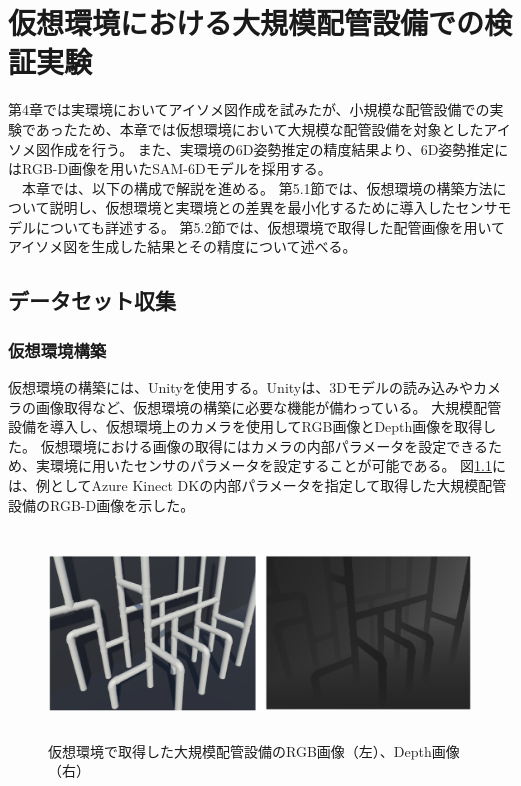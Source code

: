 ﻿\chapter{仮想環境における大規模配管設備での検証実験}
第4章では実環境においてアイソメ図作成を試みたが、小規模な配管設備での実験であったため、本章では仮想環境において大規模な配管設備を対象としたアイソメ図作成を行う。
また、実環境の6D姿勢推定の精度結果より、6D姿勢推定にはRGB-D画像を用いたSAM-6Dモデルを採用する。\\
　本章では、以下の構成で解説を進める。
第5.1節では、仮想環境の構築方法について説明し、仮想環境と実環境との差異を最小化するために導入したセンサモデルについても詳述する。
第5.2節では、仮想環境で取得した配管画像を用いてアイソメ図を生成した結果とその精度について述べる。

\section{データセット収集}
\subsection{仮想環境構築}
仮想環境の構築には、Unityを使用する。Unityは、3Dモデルの読み込みやカメラの画像取得など、仮想環境の構築に必要な機能が備わっている。
大規模配管設備を導入し、仮想環境上のカメラを使用してRGB画像とDepth画像を取得した。
仮想環境における画像の取得にはカメラの内部パラメータを設定できるため、実環境に用いたセンサのパラメータを設定することが可能である。
図\ref{fig:5-f1}には、例としてAzure Kinect DKの内部パラメータを指定して取得した大規模配管設備のRGB-D画像を示した。
\begin{figure}[htbt]
    \centering
    \includegraphics[height=55mm]{Figure/ex_sim.eps}
    \caption{仮想環境で取得した大規模配管設備のRGB画像（左）、Depth画像（右）}
    \label{fig:5-f1}
\end{figure}

